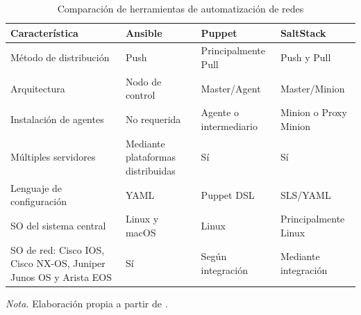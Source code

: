 \documentclass[12pt,a4paper]{article}
\begin{document}
\begin{table}[H]
    \centering
    \caption{Comparación de herramientas de automatización de redes}
    \label{tab:comparacion_automatizacion}

    \begin{tabularx}{\textwidth}{p{}XXX}
        \toprule

        \textbf{Característica} &
        \textbf{Ansible} &
        \textbf{Puppet} &
        \textbf{SaltStack} \\

        \midrule

        Método de distribución &
        Push &
        Principalmente Pull &
        Push y Pull \\

        Arquitectura &
        Nodo de control &
        Master/Agent &
        Master/Minion \\

        Instalación de agentes &
        No requerida &
        Agente o intermediario &
        Minion o Proxy Minion \\

        Múltiples servidores &
        Mediante plataformas distribuidas &
        Sí &
        Sí \\

        Lenguaje de configuración &
        YAML &
        Puppet DSL &
        SLS/YAML \\

        SO del sistema central &
        Linux y macOS &
        Linux &
        Principalmente Linux \\

        SO de red: Cisco IOS, Cisco NX-OS,
        Juniper Junos OS y Arista EOS &
        Sí &
        Según integración &
        Mediante integración \\

        \bottomrule
    \end{tabularx}

    \vspace{0.2cm}

    {\footnotesize
    \textit{Nota.} Elaboración propia a partir de
    \parencite{geerling2020ansible,myers2015saltstack,
    puppet_documentation,redhat_ansible_network,
    salt_user_guide,salt_napalm_proxy}.}
\end{table}


\end{document}
